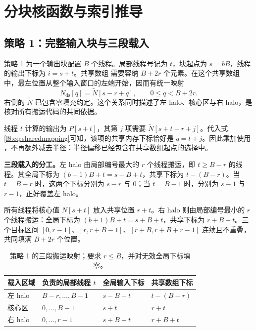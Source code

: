 \section{分块核函数与索引推导}
\label{l8:sec:implementation}
\subsection{策略 1：完整输入块与三段载入}
策略 1 为一个输出块配置 $B$ 个线程。局部线程号记为 $t$，块起点为 $s=bB$，线程的输出下标为 $i=s+t$。共享数组 \mbox{} 需要容纳 $B+2r$ 个元素。在这个共享数组中，最左位置从整个输入窗口的左端开始，因而有统一映射
\begin{equation}
 \boxed{\quad N_{\mathrm{ds}}[q]=\widetilde N[s-r+q],\qquad 0\le q<B+2r.\quad}
\label{l8:eq:sharedmapping}
\end{equation}
右侧的 $\widetilde N$ 已包含零填充约定。这个关系同时描述了左 halo、核心区与右 halo，是核对所有搬运代码的共同依据。

线程 $t$ 计算的输出为 $P[s+t]$，其第 $j$ 项需要 $\widetilde N[s+t-r+j]$。代入式\eqref{l8:eq:sharedmapping}可知，该项的共享内存下标恰好是 $q=t+j$。因此乘加使用 ，不再额外减去半径：半径偏移已经包含在共享数组起点的选择中。

\textbf{三段载入的分工。}左 halo 由局部编号最大的 $r$ 个线程搬运，即 $t\ge B-r$ 的线程。其全局下标为 $(b-1)B+t=s-B+t$，共享下标为 $t-(B-r)$。当 $t=B-r$ 时，这两个下标分别为 $s-r$ 与 $0$；当 $t=B-1$ 时，分别为 $s-1$ 与 $r-1$，正好覆盖左 halo。

所有线程将核心值 $N[s+t]$ 放入共享位置 $r+t$。右 halo 则由局部编号最小的 $r$ 个线程搬运：全局下标为 $(b+1)B+t=s+B+t$，共享下标为 $r+B+t$。三个目标区间 $[0,r-1]$、$[r,r+B-1]$、$[r+B,r+B+ r-1]$ 连续且不重叠，共同填满 $B+2r$ 个位置。

\begin{table}[H]
\centering\small
\begin{tabularx}{\textwidth}{@{}p{}p{}Y Y@{}}
\toprule
载入区域 & 负责的局部线程 $t$ & 全局输入下标 & 共享数组下标 \\
\midrule
左 halo & $B-r,\ldots,B-1$ & $s-B+t$ & $t-(B-r)$ \\
核心区 & $0,\ldots,B-1$ & $s+t$ & $r+t$ \\
右 halo & $0,\ldots,r-1$ & $s+B+t$ & $r+B+t$ \\
\bottomrule
\end{tabularx}
\caption{策略 1 的三段搬运映射；要求 $r\le B$，并对无效全局下标填零。}
\end{table}

